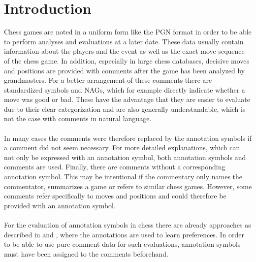 \documentclass[article,type=msc,colorback,accentcolor=tud7b]{tudthesis}
\begin{document}
  \author{Florian Beck}
  \dateofexam{\today}{\today}
  \makethesistitle
  
  
  \clearpage
  
  
  \clearpage
  
  \setcounter{tocdepth}{6}
  \tableofcontents
  \setcounter{page}{6}
  \clearpage
  
  \listoffigures
  \listoftables
  \clearpage
  
  \section{Introduction}
    Chess games are noted in a uniform form like the PGN format in order to be able to perform analyses and evaluations at a later date. These data usually contain information about the players and the event as well as the exact move sequence of the chess game. In addition, especially in large chess databases, decisive moves and positions are provided with comments after the game has been analyzed by grandmasters. For a better arrangement of these comments there are standardized symbols and NAGs, which for example directly indicate whether a move was good or bad. These have the advantage that they are easier to evaluate due to their clear categorization and are also generally understandable, which is not the case with comments in natural language. \\\\
    In many cases the comments were therefore replaced by the annotation symbols if a comment did not seem necessary. For more detailed explanations, which can not only be expressed with an annotation symbol, both annotation symbols and comments are used. Finally, there are comments without a corresponding annotation symbol. This may be intentional if the commentary only names the commentator, summarizes a game or refers to similar chess games. However, some comments refer specifically to moves and positions and could therefore be provided with an annotation symbol. \\\\
    For the evaluation of annotation symbols in chess there are already approaches as described in \autocite{Wirth2014} and \autocite{Wirth2015}, where the annotations are used to learn preferences. In order to be able to use pure comment data for such evaluations, annotation symbols must have been assigned to the comments beforehand.
\end{document}
